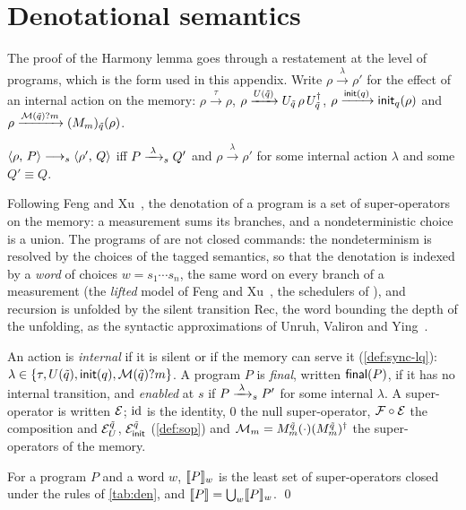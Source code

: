 \section{Denotational semantics}\label{app:den}\label{sec:den}

The proof of the Harmony lemma goes through a restatement at the level of
programs, which is the form used in this appendix. Write
$\rho \xrightarrow{\lambda} \rho'$ for the effect of an internal action on the
memory: $\rho \xrightarrow{\tau} \rho$, $\rho \xrightarrow{U(\tilde q)} U_{\tilde q}\,\rho\,U_{\tilde q}^{\dagger}$,
$\rho \xrightarrow{\mathsf{init}(q)} \mathsf{init}_{q}(\rho)$ and $\rho \xrightarrow{\mathcal{M}(\tilde q)?m} (M_m)_{\tilde q}(\rho)$.

\begin{lemma}\label{lem:harmony-prog}
$\langle \rho ,\, P \rangle \longrightarrow_{s} \langle \rho' ,\, Q \rangle$ iff $P \xrightarrow{\;\lambda\;}_{s} Q'$ and
$\rho \xrightarrow{\lambda} \rho'$ for some internal action $\lambda$ and some
$Q' \equiv Q$.
\end{lemma}

Following Feng and Xu~\cite{FengXu23}, the denotation of a program is a set
of super-operators on the memory: a measurement sums its branches, and a
nondeterministic choice is a union. The programs of \lqCCS are not closed
commands: the nondeterminism is resolved by the choices of the tagged
semantics, so that the denotation is indexed by a \emph{word} of choices
$w = s_1 \cdots s_n$, the same word on every branch of a measurement (the
\emph{lifted} model of Feng and Xu~\cite{FengXu23}, the schedulers of \lqCCS), and
recursion is unfolded by the silent transition Rec, the word bounding the
depth of the unfolding, as the syntactic approximations of Unruh, Valiron and
Ying~\cite[Lemma 3.3]{UVY26}.

An action is \emph{internal} if it is silent or if the memory can serve it
(\cref{def:sync-lq}): $\lambda \in \{\tau, U(\tilde q), \mathsf{init}(q), \mathcal{M}(\tilde q)?m\}$. A program $P$ is
\emph{final}, written $\mathsf{final}(P)$, if it has no internal transition, and
\emph{enabled} at $s$ if $P \xrightarrow{\;\lambda\;}_{s} P'$ for some internal $\lambda$.
A super-operator is written $\mathcal{E}$; $\mathrm{id}$ is the identity, $0$ the null
super-operator, $\mathcal{F} \circ \mathcal{E}$ the composition and
$\mathcal{E}_U^{\tilde q}$, $\mathcal{E}_{\mathsf{init}}^{\tilde q}$
(\cref{def:sop}) and $\mathcal{M}_m = M_m^{\tilde q}(\cdot)(M_m^{\tilde q})^\dagger$
the super-operators of the memory.

\begin{definition}[Denotation]\label{def:den}
For a program $P$ and a word $w$, $\llbracket P \rrbracket_{w}$ is the least set of
super-operators closed under the rules of \cref{tab:den}, and
$\llbracket P \rrbracket = \bigcup_w \llbracket P \rrbracket_{w}$.
\qed
\end{definition}

